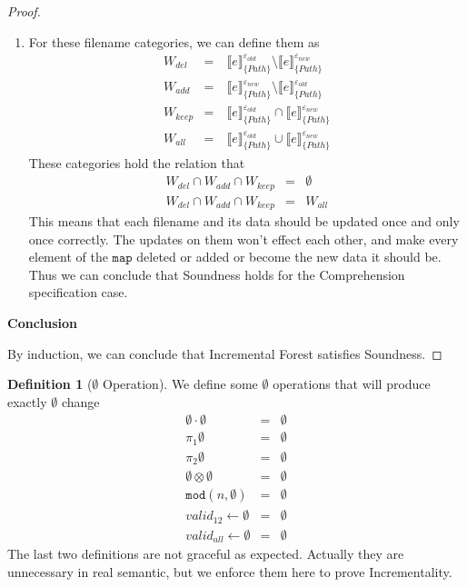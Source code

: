 \documentclass[10pt,twoside,a4paper]{article}
\theoremstyle{theorem}
\theoremstyle{lemma}
\theoremstyle{property}
\theoremstyle{definition}
\newtheorem{definition}{Definition}[section]
\theoremstyle{assumption}
\def\fst{\pi_1}
\def\snd{\pi_2}
\begin{document}
\begin{proof}
\begin{enumerate}
	\item
	For these filename categories, we can define them as
	\begin{eqnarray*}
		W_{del} &=& ~\llbracket e \rrbracket^{\varepsilon_{old}}_{\{Path\}} \setminus \llbracket e \rrbracket^{\varepsilon_{new}}_{\{Path\}}\\
		W_{add} &=& ~\llbracket e \rrbracket^{\varepsilon_{new}}_{\{Path\}} \setminus \llbracket e \rrbracket^{\varepsilon_{old}}_{\{Path\}}\\
		W_{keep} &=& ~\llbracket e \rrbracket^{\varepsilon_{old}}_{\{Path\}} \cap \llbracket e \rrbracket^{\varepsilon_{new}}_{\{Path\}}\\
		W_{all} &=& ~\llbracket e \rrbracket^{\varepsilon_{old}}_{\{Path\}} \cup \llbracket e \rrbracket^{\varepsilon_{new}}_{\{Path\}}
	\end{eqnarray*}
	These categories hold the relation that
	\begin{eqnarray*}
		W_{del} \cap W_{add} \cap W_{keep} &=& \emptyset\\
		W_{del} \cap W_{add} \cap W_{keep} &=& W_{all}
	\end{eqnarray*}
	This means that each filename and its data should be updated once and only once correctly. The updates on them won't effect each other, and make every element of the $\mathtt{map}$ deleted or added or become the new data it should be. Thus we can conclude that Soundness holds for the Comprehension specification case.
	\end{enumerate} 

	\textbf{Conclusion}

	By induction, we can conclude that Incremental Forest satisfies Soundness.
\end{proof}

\newpage

\begin{definition}[$\emptyset$ Operation]
We define some $\emptyset$ operations that will produce exactly $\emptyset$ change
\begin{eqnarray}
	\emptyset \cdot \emptyset &=& \emptyset\\
	\fst\emptyset &=& \emptyset\\
	\snd\emptyset &=& \emptyset\\
	\emptyset \otimes \emptyset &=& \emptyset\\
	\mathtt{mod}(n, \emptyset) &=& \emptyset\\
	valid_{12} \leftarrow \emptyset &=& \emptyset\\
	valid_{all} \leftarrow \emptyset &=& \emptyset
\end{eqnarray}
The last two definitions are not graceful as expected. Actually they are unnecessary in real semantic, but we enforce them here to prove Incrementality.
\end{definition}
\end{document}
